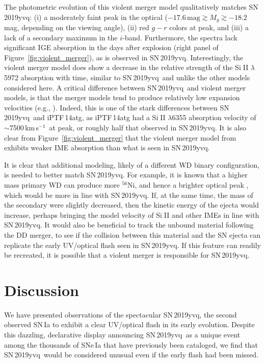\documentclass[twocolumn]{aastex63}
\def\ion#1#2{#1$\;${\footnotesize\rm{#2}}\relax}
\newcommand{\kms}{km\,s$^{-1}$}
\newcommand{\radni}{$^{56}$Ni}
\newcommand{\sn}{SN\,2019yvq}
\begin{document}
The photometric evolution of this violent merger model qualitatively matches
\sn: (i) a moderately faint peak in the optical ($-17.6\,\mathrm{mag} \gtrsim
M_g \gtrsim -18.2$\,mag, depending on the viewing angle), (ii) red $g - r$
colors at peak, and (iii) a lack of a secondary maximum in the $i$-band.
Furthermore, the spectra lack significant IGE absorption in the days after
explosion (right panel of Figure~\ref{fig:violent_merger}), as is observed in
\sn. Interestingly, the violent merger model does show a decrease in the
relative strength of the \ion{Si}{II} $\lambda$5972 absorption with time,
similar to \sn\ and unlike the other models considered here. A critical
difference between \sn\ and violent merger models, is that the merger models
tend to produce relatively low expansion velocities (e.g.,
\citealt{Pakmor10,Kromer13a,Kromer16}). Indeed, this is one of the stark
differences between \sn\ and iPTF\,14atg, as iPTF\,14atg had a \ion{Si}{II}
$\lambda$6355 absorption velocity of $\sim$7500\,\kms\ at peak, or roughly
half that observed in \sn. It is also clear from
Figure~\ref{fig:violent_merger} that the violent merger model from
\citet{Kromer16} exhibits weaker IME absorption than what is seen in \sn.

It is clear that additional modeling, likely of a different WD binary
configuration, is needed to better match \sn. For example, it is known that a
higher mass primary WD can produce more \radni, and hence a brighter optical
peak \citep[e.g.,][]{Pakmor12}, which would be more in line with \sn. If, at
the same time, the mass of the secondary were slightly decreased, then the
kinetic energy of the ejecta would increase, perhaps bringing the model
velocity of \ion{Si}{II} and other IMEs in line with \sn. It would also be
beneficial to track the unbound material following the DD merger, to see if
the collision between this material and the SN ejecta can replicate the early
UV/optical flash seen in \sn. If this feature can readily be recreated, it is
possible that a violent merger is responsible for \sn.

\section{Discussion}\label{sec:conclusions}



We have presented observations of the spectacular \sn, the second observed
SN\,Ia to exhibit a clear UV/optical flash in its early evolution. Despite
this dazzling, declarative display announcing \sn\ as a unique event among the
thousands of SNe\,Ia that have previously been cataloged, we find that \sn\
would be considered unusual even if the early flash had been missed.
\end{document}
